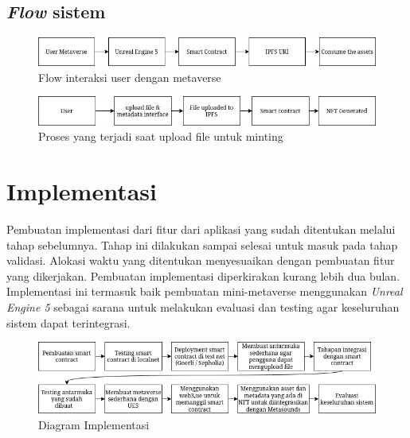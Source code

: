 \subsection{\emph{Flow} sistem}
\begin{figure} [ht] \centering
  \includegraphics[scale=0.55]{gambar/userinteractionmetaverse.png}
  \caption{Flow interaksi user dengan metaverse}
  \label{fig:userinteractionmetaverse}
\end{figure}
\begin{figure} [ht] \centering
  \includegraphics[scale=0.55]{gambar/userinteractionupload.png}
  \caption{Proses yang terjadi saat upload file untuk minting}
  \label{fig:userinteractionupload}
\end{figure}

\section{Implementasi}

Pembuatan implementasi dari fitur dari aplikasi yang sudah ditentukan melalui tahap
sebelumnya. Tahap ini dilakukan sampai selesai untuk masuk pada tahap validasi. Alokasi
waktu yang ditentukan menyesuaikan dengan pembuatan fitur yang dikerjakan. Pembuatan
implementasi diperkirakan kurang lebih dua bulan. Implementasi ini termasuk baik pembuatan mini-metaverse
menggunakan \emph{Unreal Engine 5} sebagai sarana untuk melakukan evaluasi dan testing agar keseluruhan sistem dapat terintegrasi.

\begin{figure} [ht] \centering
  \includegraphics[scale=0.60]{gambar/methodologydiagram.png}
  \caption{Diagram Implementasi}
  \label{fig:diagramimplementasi}
\end{figure}

